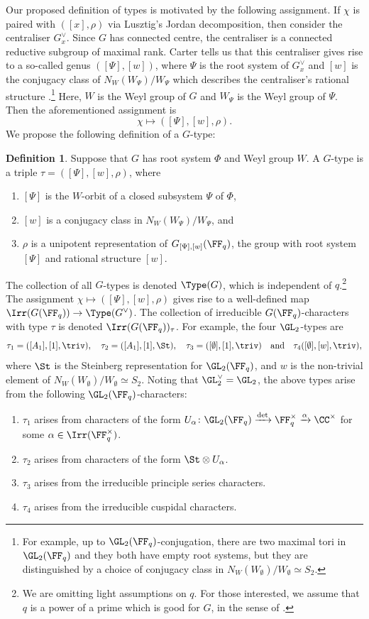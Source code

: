 \documentclass{amsart}
\theoremstyle{plain}
\theoremstyle{definition}
\newtheorem{defe}[thm]{Definition}
\theoremstyle{remark}
\begin{document}
Our proposed definition of types is motivated by the following assignment. If $\chi$ is paired with $([x],\rho)$ via Lusztig's Jordan decomposition, then consider the centraliser $G^\vee_x$. Since $G$ has connected centre, the centraliser is a connected reductive subgroup of maximal rank. Carter tells us that this centraliser gives rise to a so-called genus $([\Psi],[w])$, where $\Psi$ is the root system of $G^\vee_x$ and $[w]$ is the conjugacy class of $N_W(W_\Psi)/W_\Psi$ which describes the centraliser's rational structure \cite{Carter78}.\footnote{For example, up to $\GL_2(\FF_q)$-conjugation, there are two maximal tori in $\GL_2(\FF_q)$ and they both have empty root systems, but they are distinguished by a choice of conjugacy class in $N_W(W_\emptyset)/W_\emptyset\simeq S_2$.} Here, $W$ is the Weyl group of $G$ and $W_\Psi$ is the Weyl group of $\Psi$. Then the aforementioned assignment is
\[
\chi\mapsto ([\Psi],[w],\rho).
\]
We propose the following definition of a $G$-type:
\begin{defe}\label{DefinitionType}
Suppose that $G$ has root system $\Phi$ and Weyl group $W$. A $G$-type is a triple $\tau=([\Psi],[w],\rho)$, where 
\begin{enumerate}[\itshape(i)]
\item $[\Psi]$ is the $W$-orbit of a closed subsystem $\Psi$ of $\Phi$, 
\item $[w]$ is a conjugacy class in $N_{W}(W_\Psi)/W_\Psi$, and 
\item $\rho$ is a unipotent representation of $G_{[\Psi],[w]}(\FF_q)$, the group with root system $[\Psi]$ and rational structure $[w]$.
\end{enumerate}
\end{defe}
The collection of all $G$-types is denoted $\Type(G)$, which is independent of $q$.\footnote{We are omitting light assumptions on $q$. For those interested, we assume that $q$ is a power of a prime which is good for $G$, in the sense of \cite[\S1.14]{Carter93}.} The assignment $\chi\mapsto ([\Psi],[w],\rho)$ gives rise to a well-defined map $\Irr(G(\FF_q))\to\Type(G^\vee)$. The collection of irreducible $G(\FF_q)$-characters with type $\tau$ is denoted $\Irr(G(\FF_q))_\tau$. For example, the four $\GL_2$-types are
\[
\tau_1=([A_1],[1],\triv),\quad \tau_2=([A_1],[1],\St),\quad \tau_3=([\emptyset],[1],\triv)\quad \text{and}\quad \tau_4([\emptyset],[w],\triv), 
\]
where $\St$ is the Steinberg representation for $\GL_2(\FF_q)$, and $w$ is the non-trivial element of $N_W(W_\emptyset)/W_\emptyset\simeq S_2$. Noting that $\GL_2^\vee=\GL_2$, the above types arise from the following $\GL_2(\FF_q)$-characters:
\begin{enumerate}[\itshape(i)]
\item $\tau_1$ arises from characters of the form $U_\alpha\colon\GL_2(\FF_q)\xrightarrow{\det}\FF_q^\times\xrightarrow{\alpha}\CC^\times$ for some $\alpha\in\Irr(\FF_q^\times)$. 
\item $\tau_2$ arises from characters of the form $\St\otimes U_\alpha$. 
\item $\tau_3$ arises from the irreducible principle series characters.
\item $\tau_4$ arises from the irreducible cuspidal characters.
\end{enumerate}
\end{document}
